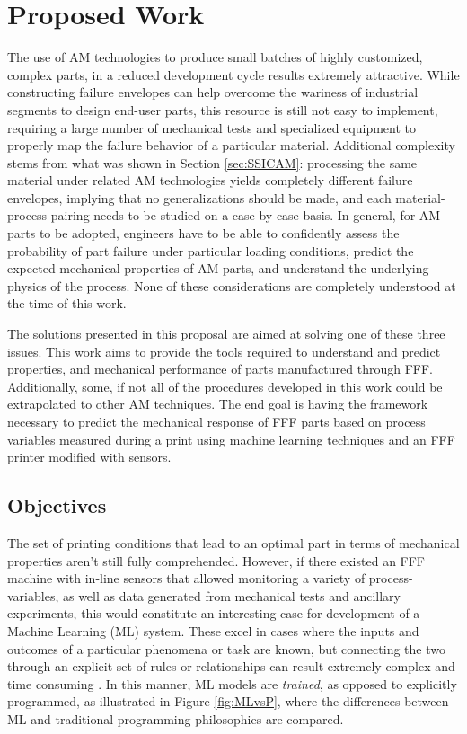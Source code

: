 \documentclass[main.tex]{subfiles}
\begin{document}
\chapter{Proposed Work} \label{ch:proposal}

The use of AM technologies to produce small batches of highly customized, complex parts, in a reduced development cycle results extremely attractive. While constructing failure envelopes can help overcome the wariness of industrial segments to design end-user parts, this resource is still not easy to implement, requiring a large number of mechanical tests and specialized equipment to properly map the failure behavior of a particular material. Additional complexity stems from what was shown in Section \ref{sec:SSICAM}: processing the same material under related AM technologies yields completely different failure envelopes, implying that no generalizations should be made, and each material-process pairing needs to be studied on a case-by-case basis. In general, for AM parts to be adopted, engineers have to be able to confidently assess the probability of part failure under particular loading conditions, predict the expected mechanical properties of AM parts, and understand the underlying physics of the process. None of these considerations are completely understood at the time of this work.

The solutions presented in this proposal are aimed at solving one of these three issues. This work aims to provide the tools required to understand and predict properties, and mechanical performance of parts manufactured through FFF. Additionally, some, if not all of the procedures developed in this work could be extrapolated to other AM techniques. The end goal is having the framework necessary to predict the mechanical response of FFF parts based on process variables measured during a print using machine learning techniques and an FFF printer modified with sensors. 

\section{Objectives} \label{sec:objectives}

The set of printing conditions that lead to an optimal part in terms of mechanical properties aren't still fully comprehended. However, if there existed an FFF machine with in-line sensors that allowed monitoring a variety of process-variables, as well as data generated from mechanical tests and ancillary experiments, this would constitute an interesting case for development of a Machine Learning (ML) system. These excel in cases where the inputs and outcomes of a particular phenomena or task are known, but connecting the two through an explicit set of rules or relationships can result extremely complex and time consuming \cite{Chollet2018}. In this manner, ML models are \emph{trained}, as opposed to explicitly programmed, as illustrated in Figure \ref{fig:MLvsP}, where the differences between ML and traditional programming philosophies are compared. 
\end{document}
